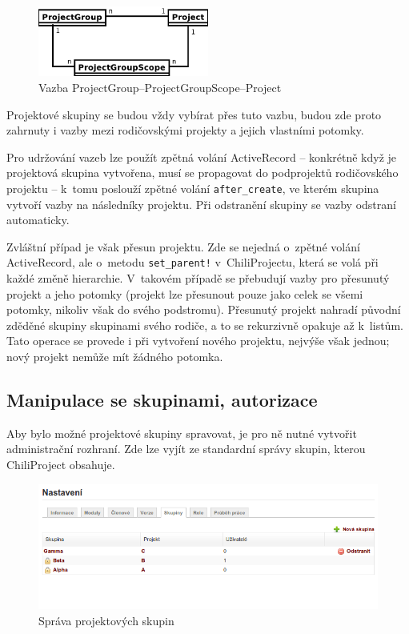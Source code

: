 \documentclass[thesis=B,czech]{FITthesis}[2012/05/02]
\begin{document}
\begin{figure}[htbp]
\centering
\includegraphics[width=0.5\textwidth]{group-er4.pdf}
\caption{Vazba ProjectGroup--ProjectGroupScope--Project}
\end{figure}

Projektové skupiny se budou vždy vybírat přes tuto vazbu, budou zde
proto zahrnuty i vazby mezi rodičovskými projekty a jejich vlastními
potomky.

Pro udržování vazeb lze použít zpětná volání ActiveRecord -- konkrétně
když je projektová skupina vytvořena, musí se propagovat do podprojektů
rodičovského projektu -- k~tomu poslouží zpětné volání
\lstinline!after_create!, ve kterém skupina vytvoří vazby na následníky
projektu. Při odstranění skupiny se vazby odstraní automaticky.

Zvláštní případ je však přesun projektu. Zde se nejedná o~zpětné volání
ActiveRecord, ale o~metodu \lstinline"set_parent!" v~ChiliProjectu,
která se volá při každé změně hierarchie. V~takovém případě se přebudují
vazby pro přesunutý projekt a jeho potomky (projekt lze přesunout pouze
jako celek se všemi potomky, nikoliv však do svého podstromu). Přesunutý
projekt nahradí původní zděděné skupiny skupinami svého rodiče, a to se
rekurzivně opakuje až k~listům.
Tato operace se provede i při vytvoření nového projektu, nejvýše však
jednou; nový projekt nemůže mít žádného potomka.

\subsection{Manipulace se skupinami, autorizace}

Aby bylo možné projektové skupiny spravovat, je pro ně nutné vytvořit
administrační rozhraní. Zde lze vyjít ze standardní správy skupin, kterou
ChiliProject obsahuje.

\begin{figure}[tbp]
\centering
\includegraphics[width=1\textwidth]{group-gui1.png}
\caption{Správa projektových skupin}
\end{figure}
\end{document}
